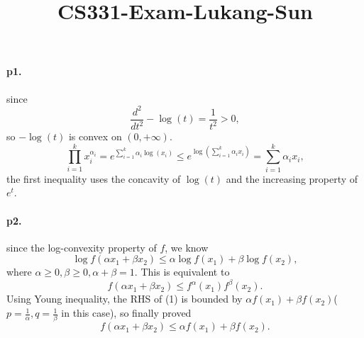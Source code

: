 \documentclass[8pt,a4paper]{article}
\title{CS331-Exam-Lukang-Sun}
\begin{document}
	\maketitle
	
	\paragraph{p1.}since 
	\begin{equation*}
		\frac{d^2}{dt^2}-\log(t)=\frac{1}{t^2}>0,
	\end{equation*}
so $-\log(t)$ is convex on $(0,+\infty)$.
\begin{equation*}
\prod_{i=1}^kx_i^{\alpha_i}=e^{\sum_{i=1}^{k}\alpha_i\log(x_i)}\leq e^{\log(\sum_{i=1}^{k}\alpha_ix_i)}=\sum_{i=1}^k\alpha_ix_i,
\end{equation*}
the first inequality uses the concavity of $\log(t)$ and the increasing property of $e^t$.

	\paragraph{p2.}
	since the log-convexity property of $f$, we know
	\begin{equation*}
		\log f(\alpha x_1+\beta x_2)\leq \alpha\log f(x_1)+\beta\log f(x_2),
	\end{equation*}
where $\alpha\geq0,\beta\geq0,\alpha+\beta=1$. This is equivalent to 
\begin{equation}
	f(\alpha x_1+\beta x_2)\leq f^{\alpha}(x_1)f^{\beta}(x_2).
\end{equation}
	Using Young inequality, the RHS of (1) is bounded by $\alpha f(x_1)+\beta f(x_2)$($p=\frac{1}{\alpha},q=\frac{1}{\beta}$ in this case), so finally proved
	\begin{equation*}
		f(\alpha x_1+\beta x_2)\leq \alpha f(x_1)+\beta f(x_2).
	\end{equation*}
	
\end{document}
